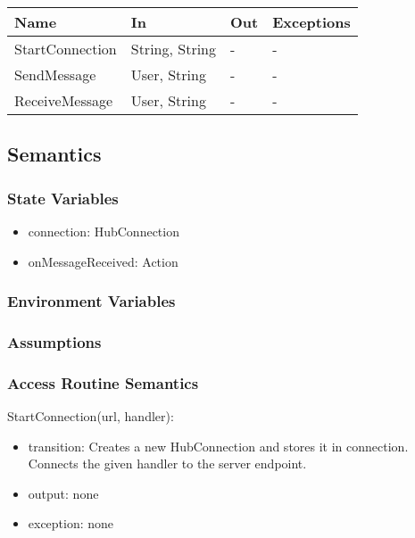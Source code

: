 \documentclass[12pt, titlepage]{article}
\begin{document}
\begin{itemize}
\begin{center}
\begin{tabular}{p{2cm} p{4cm} p{4cm} p{2cm}}
\hline
\textbf{Name} & \textbf{In} & \textbf{Out} & \textbf{Exceptions} \\
\hline
StartConnection & String, String & - & - \\
SendMessage & User, String & - & - \\
ReceiveMessage & User, String & - & - \\

\hline
\end{tabular}
\end{center}

\subsection{Semantics}

\subsubsection{State Variables}

\begin{itemize}
\item connection: HubConnection
\item onMessageReceived: Action
\end{itemize}

\subsubsection{Environment Variables}

\subsubsection{Assumptions}

\subsubsection{Access Routine Semantics}

\noindent StartConnection(url, handler):
\begin{itemize}
\item transition: Creates a new HubConnection and stores it in connection. Connects the given handler to the server endpoint.
\item output: none
\item exception: none
\end{itemize}


\end{itemize}
\end{document}

